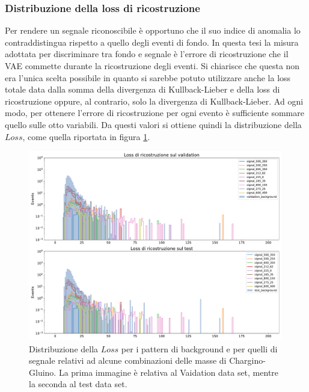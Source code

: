\subsubsection{Distribuzione della loss di ricostruzione}
\label{reco_loss}

Per rendere un segnale riconoscibile è opportuno che il suo indice di anomalia lo contraddistingua rispetto a quello degli eventi di fondo. In questa tesi la misura adottata per discriminare tra fondo e segnale è l'errore di ricostruzione che il VAE commette durante la ricostruzione degli eventi. Si chiarisce che questa non era l'unica scelta possibile in quanto si sarebbe potuto utilizzare anche la loss totale data dalla somma della divergenza di Kullback-Lieber e della loss di ricostruzione oppure, al contrario, solo la divergenza di Kullback-Lieber. 
Ad ogni modo, per ottenere l'errore di ricostruzione per ogni evento è sufficiente sommare quello sulle otto variabili. Da questi valori si ottiene quindi la distribuzione della $\textit{Loss}$, come quella riportata in figura \ref{distribuzione_loss}. 

\begin{figure}[h!]
	\centering
	\includegraphics[width=0.99\textwidth]{figs/risultati_simulazione/distribuzioneLoss.pdf}
	\caption{Distribuzione della $\textit{Loss}$ per i pattern di background e per quelli di segnale relativi ad alcune combinazioni delle masse di Chargino-Gluino. La prima immagine è relativa al Vaidation data set, mentre la seconda al test data set.}
	\label{distribuzione_loss}
\end{figure}

